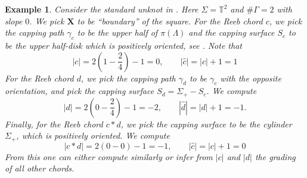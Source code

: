 \documentclass[11pt]{amsart}
\theoremstyle{mystyle}
\newtheorem{example}[example]{Example}
\newcommand{\<}{\langle}
\renewcommand{\>}{\rangle}
\begin{document}
\begin{example}
    Consider the standard unknot in . Here $\Sigma = \mathbb{T}^2$ and $\# \Gamma = 2$ with slope $0$. We pick $\mathbf{X}$ to be ``boundary'' of the square. For the Reeb chord $c$, we pick the capping path $\gamma_c$ to be the upper half of $\pi(\Lambda)$ and the capping surface $S_c$ to be the upper half-disk which is positively oriented, see . Note that \[|c| = 2\left(1 - \frac{2}{4}\right) - 1 = 0,\qquad |\widehat{c}| = |c| + 1 = 1\] For the Reeb chord $d$, we pick the capping path $\gamma_d$ to be $\gamma_c$ with the opposite orientation, and pick the capping surface $S_d = \Sigma_+ - S_c$. We compute \[|d| = 2\left(0-\frac{2}{4}\right) -1= -2, \qquad |\widehat{d}| = |d| + 1 = -1.\] 
    Finally, for the Reeb chord $c*d$, we pick the capping surface to be the cylinder $\Sigma_+$, which is positively oriented. We compute    \[|c*d| = 2(0-0)-1=-1,\qquad |\widehat{c}| = |c|+1 = 0\]
    From this one can either compute similarly or infer from $|c|$ and $|d|$ the grading of all other chords.
\end{example}
\end{document}
